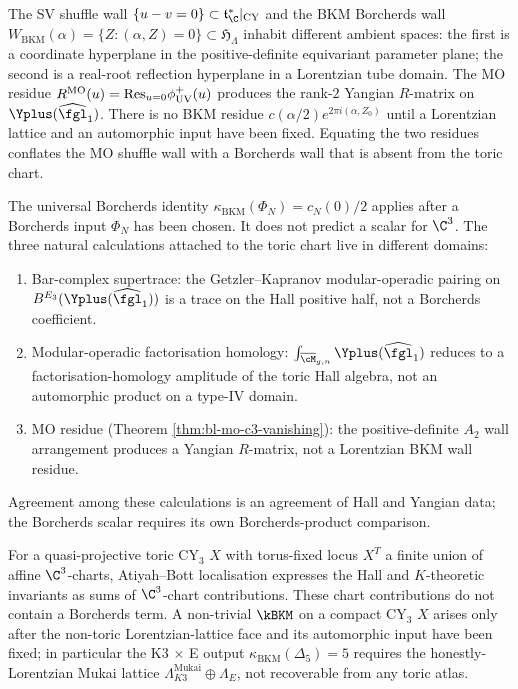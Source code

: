 \begin{remark}
\label{rem:bl-mo-c3-coha-vs-bkm-wall}
The SV shuffle wall $\{u - v = 0\} \subset \mathfrak t^*_\C|_{\mathrm{CY}}$
and the BKM Borcherds wall $W_{\mathrm{BKM}}(\alpha) = \{Z : (\alpha, Z)
= 0\} \subset \mathfrak H_\Lambda$ inhabit different ambient spaces:
the first is a coordinate hyperplane in the positive-definite
equivariant parameter plane; the second is a real-root reflection
hyperplane in a Lorentzian tube domain. The MO residue
$R^{\mathrm{MO}}(u) = \mathrm{Res}_{u = 0} \phi^{+}_{\mathrm{UV}}(u)$ produces the
rank-$2$ Yangian $R$-matrix on $\Yplus(\widehat{\fgl}_1)$. There is no
BKM residue \(c(\alpha/2)e^{2\pi i(\alpha,Z_0)}\) until a Lorentzian
lattice and an automorphic input have been fixed. Equating the two
residues conflates the MO shuffle wall with a Borcherds wall that is
absent from the toric chart.
\end{remark}

\begin{remark}
\label{rem:bl-mo-c3-three-path}
The universal Borcherds identity
$\kappa_{\mathrm{BKM}}(\Phi_N) = c_N(0)/2$ applies after a Borcherds
input \(\Phi_N\) has been chosen. It does not predict a scalar for
\(\C^3\). The three natural calculations attached to the toric chart
live in different domains:
\begin{enumerate}[label=\textup{(\roman*)}]
 \item Bar-complex supertrace: the Getzler--Kapranov modular-operadic
 pairing on $B^{E_3}(\Yplus(\widehat{\fgl}_1))$ is a trace on the
 Hall positive half, not a Borcherds coefficient.
 \item Modular-operadic factorisation homology:
 $\int_{\overline{\cM}_{g, n}} \Yplus(\widehat{\fgl}_1)$ reduces to a
 factorisation-homology amplitude of the toric Hall algebra, not an
 automorphic product on a type-IV domain.
 \item MO residue (Theorem \ref{thm:bl-mo-c3-vanishing}): the
 positive-definite \(A_2\) wall arrangement produces a Yangian
 \(R\)-matrix, not a Lorentzian BKM wall residue.
\end{enumerate}
Agreement among these calculations is an agreement of Hall and
Yangian data; the Borcherds scalar requires its own Borcherds-product
comparison.
\end{remark}

\begin{corollary}
\label{cor:bl-mo-c3-toric-localisation}
For a quasi-projective toric CY$_3$ $X$ with torus-fixed locus
$X^T$ a finite union of affine $\C^3$-charts, Atiyah--Bott
localisation expresses the Hall and \(K\)-theoretic invariants as sums
of \(\C^3\)-chart contributions. These chart contributions do not
contain a Borcherds term. A non-trivial $\kBKM$ on a compact CY$_3$ $X$
arises only after the non-toric Lorentzian-lattice face and its
automorphic input have been fixed; in particular the K3
$\times$ E output $\kappa_{\mathrm{BKM}}(\Delta_5) = 5$ requires the
honestly-Lorentzian Mukai lattice $\Lambda^{\mathrm{Mukai}}_{K3}
\oplus \Lambda_E$, not recoverable from any toric atlas.
\end{corollary}

